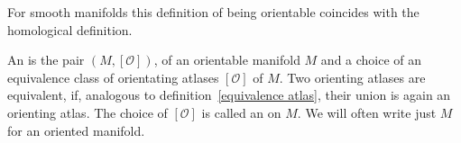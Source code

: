 \documentclass[a4paper,11pt]{article}
\begin{document}
\begin{remark}
    For smooth manifolds this definition of being orientable coincides with the homological definition.
\end{remark}









\begin{definition}\label{oriented manifold}%
    An  is the pair \((M,[\mathcal{O}])\), of an orientable manifold \(M\) and a choice of an equivalence class of orientating atlases \([\mathcal{O}]\) of \(M\). 
    Two orienting atlases are equivalent, if, analogous to definition\ \ref{equivalence atlas}, their union is again an orienting atlas. 
    The choice of \([\mathcal{O}]\) is called an  on \(M\).
    We will often write just \(M\) for an oriented manifold.
\end{definition}
\end{document}

